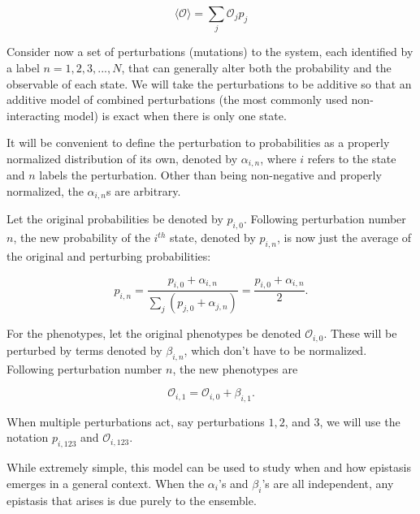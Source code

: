 \documentclass[12pt]{article}
\def\be{\begin{equation}}
\def\ee{\end{equation}}
\def\O{\mathcal{O}}
\begin{document}
\be
\langle \O \rangle = \sum_j \O_j p_j
\ee

Consider now a set of perturbations (mutations) to the system, each identified by a label $n = 1,2,3,...,N$, that can generally alter both the probability and the observable of each state.  We will take the perturbations to be additive so that an additive model of combined perturbations (the most commonly used non-interacting model) is exact when there is only one state.  

It will be convenient to define the perturbation to probabilities as a properly normalized distribution of its own, denoted by $\alpha_{i,n}$, where $i$ refers to the state and $n$ labels the perturbation.  Other than being non-negative and properly normalized, the $\alpha_{i,n}$s are arbitrary.  

Let the original probabilities be denoted by $p_{i,0}$.  Following perturbation number $n$, the new probability of the $i^{th}$ state, denoted by $p_{i,n}$, is now just the average of the original and perturbing probabilities:

\be
p_{i,n} = \frac{p_{i,0} + \alpha_{i,n}}{\sum_j (p_{j,0} + \alpha_{j,n})} = \frac{p_{i,0} + \alpha_{i,n}}{2}.
\ee 

For the phenotypes, let the original phenotypes be denoted $\O_{i,0}$.  These will be perturbed by terms denoted by $\beta_{i,n}$, which don't have to be normalized.  Following perturbation number $n$, the new phenotypes are 

\be
\O_{i,1} = \O_{i,0} + \beta_{i,1}.
\ee

\noindent When multiple perturbations act, say perturbations $1,2$, and $3$, we will use the notation $p_{i,123}$ and $\O_{i,123}$.


While extremely simple, this model can be used to study when and how epistasis emerges in a general context.  When the $\alpha_i$'s and $\beta_i$'s are all independent, any epistasis that arises is due purely to the ensemble. 
\end{document}
